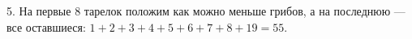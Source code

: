 5. На первые 8 тарелок положим как можно меньше грибов, а на последнюю --- все оставшиеся: $1+2+3+4+5+6+7+8+19=55.$\\
